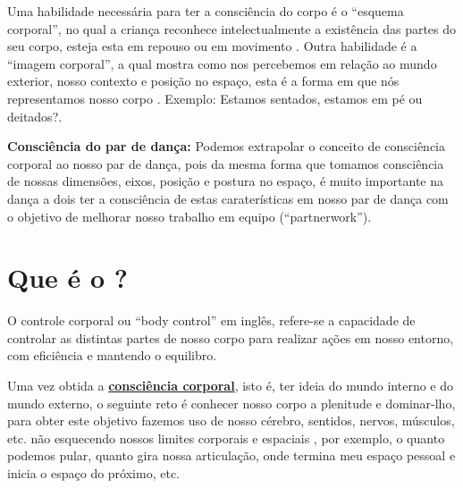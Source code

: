 Uma habilidade necessária para ter a consciência do corpo é o ``esquema corporal'',
no qual a criança reconhece intelectualmente a existência das partes do seu corpo,
esteja esta em repouso ou em movimento
\cite{bueno2016psicomotricidade} \cite[pp. 24]{checa1999desarrollo}.
Outra habilidade é a ``imagem corporal'', 
a qual mostra como nos percebemos em relação ao mundo exterior,
nosso contexto e posição no espaço, esta é a forma em que nós representamos nosso corpo \cite[pp. 22-23, 27]{da2003imagem}.
Exemplo: Estamos sentados, estamos em pé ou deitados?.

\begin{tcbinformation}
\textbf{Consciência do par de dança:}
Podemos extrapolar o conceito de consciência corporal ao nosso par de dança,
pois da mesma forma que tomamos consciência de nossas dimensões, eixos, posição e postura no espaço,
é muito importante na dança a dois ter a consciência de estas caraterísticas em nosso par de dança
com o objetivo de melhorar nosso trabalho em equipo (``partnerwork'').
\end{tcbinformation}

\section{Que é o \bodycontrol?}
\label{sec:BodyControl}

 O controle corporal ou ``body control'' em inglês, refere-se a capacidade
 de controlar as distintas partes de nosso corpo para realizar ações em nosso entorno, com eficiência e 
 mantendo o equilibro. 

Uma vez obtida a \hyperref[sec:BodyAwareness]{\textbf{consciência corporal}},
isto é, ter ideia do mundo interno e do mundo externo, 
o seguinte reto é conhecer nosso corpo a plenitude e dominar-lho, 
para obter este objetivo fazemos uso de nosso cérebro, sentidos, nervos, músculos, etc. 
não esquecendo nossos limites corporais e espaciais
\cite[pp. 14]{bolio2006fantasia}
\cite[pp. 27]{smith2011desarrollo},
por exemplo, o quanto podemos pular, quanto gira nossa articulação, onde termina meu espaço pessoal e inicia o espaço do próximo, etc.

